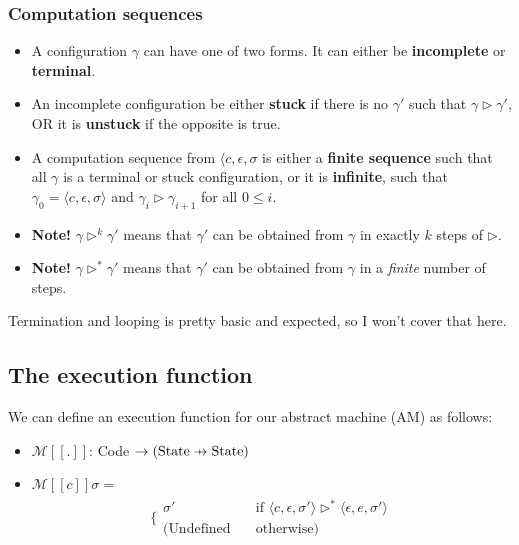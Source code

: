 \documentclass[11pt,a4paper,titlepage,dvipsnames,cmyk]{scrartcl}
\newcommand\pfun{\mathrel{\ooalign{\hfil$\mapstochar\mkern5mu$\hfil\cr$\to$\cr}}}
\begin{document}
\subsubsection{Computation sequences}%
\label{ssub:Computation sequences}
\begin{itemize}
    \item A configuration $\gamma$ can have one of two forms. It can either be
        \textbf{incomplete} or \textbf{terminal}.
    \item An incomplete configuration be either \textbf{stuck} if there is
        no $\gamma'$ such that $\gamma
        \triangleright \gamma'$, OR it is \textbf{unstuck} if the opposite is
        true.
    \item A computation sequence from $\langle c, \epsilon, \sigma$ is
        either a \textbf{finite sequence} such that all $\gamma$ is a
        terminal or stuck configuration, or it is \textbf{infinite}, such
        that $\gamma_0 = \langle c, \epsilon, \sigma \rangle$ and
        $\gamma_i \triangleright \gamma_{i+1}$ for all $0 \le i$.
    \item \textbf{Note!} $\gamma \triangleright ^k \gamma'$ means that
        $\gamma'$ can be obtained from $\gamma$ in exactly $k$ steps of
        $\triangleright$.
    \item \textbf{Note!} $\gamma \triangleright ^* \gamma'$ means that
        $\gamma'$ can be obtained from $\gamma$ in a \textit{finite}
        number of steps.
\end{itemize}

Termination and looping is pretty basic and expected, so I won't cover
that here.

\subsection{The execution function}%
\label{sub:exec-func}
We can define an execution function for our abstract machine (AM) as
follows:
\begin{itemize}
    \item $\mathcal{M}[\![.]\!]$: Code $\rightarrow (\text{State} \pfun
        \text{State})$
    \item $\mathcal{M}[\![c]\!] \sigma = $
        \begin{align*}
            \Bigg \{ 
                \begin{split}
                    \sigma' \quad &\text{if } \langle c, \epsilon, \sigma' \rangle
                    \triangleright^* \langle \epsilon, e, \sigma' \rangle \\
                    (\text{Undefined} \quad &\text{otherwise})
                \end{split}
        \end{align*}
\end{itemize}
\end{document}
